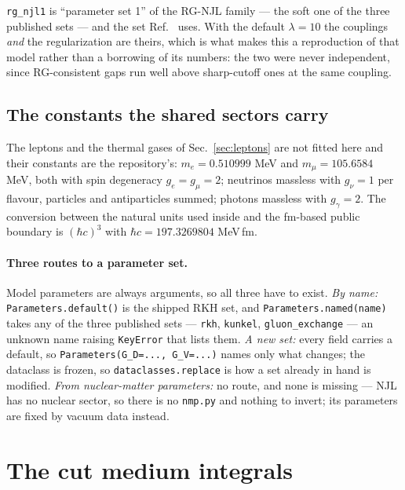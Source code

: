 \documentclass[aps,prc,onecolumn,superscriptaddress,nofootinbib,10pt]{revtex4-2}
\begin{document}
\texttt{rg\_njl1} is ``parameter set 1'' of the RG-NJL family --- the soft one
of the three published sets --- and the set Ref.~\cite{Kunkel2026} uses. With the
default $\lambda = 10$ the couplings \emph{and} the regularization are theirs,
which is what makes this a reproduction of that model rather than a borrowing
of its numbers: the two were never independent, since RG-consistent gaps run
well above sharp-cutoff ones at the same coupling.

\subsection{The constants the shared sectors carry}

The leptons and the thermal gases of Sec.~\ref{sec:leptons} are not fitted
here and their constants are the repository's:
$m_e = 0.510999$ MeV and $m_\mu = 105.6584$ MeV, both with spin degeneracy
$g_e = g_\mu = 2$; neutrinos massless with $g_\nu = 1$ per flavour, particles
and antiparticles summed; photons massless with $g_\gamma = 2$. The
conversion between the natural units used inside and the fm-based public
boundary is $(\hbar c)^3$ with $\hbar c = 197.3269804$ MeV\,fm.


\paragraph{Three routes to a parameter set.} Model parameters are always
arguments, so all three have to exist. \emph{By name:}
\texttt{Parameters.default()} is the shipped RKH set, and
\texttt{Parameters.named(name)} takes any of the three published sets ---
\texttt{rkh}, \texttt{kunkel}, \texttt{gluon\_exchange} --- an unknown name
raising \texttt{KeyError} that lists them. \emph{A new set:} every field
carries a default, so \texttt{Parameters(G\_D=..., G\_V=...)} names only what
changes; the dataclass is frozen, so \texttt{dataclasses.replace} is how a set
already in hand is modified. \emph{From nuclear-matter parameters:} no route,
and none is missing --- NJL has no nuclear sector, so there is no
\texttt{nmp.py} and nothing to invert; its parameters are fixed by vacuum data
instead.

\section{The cut medium integrals}
\label{sec:medium}
\end{document}
